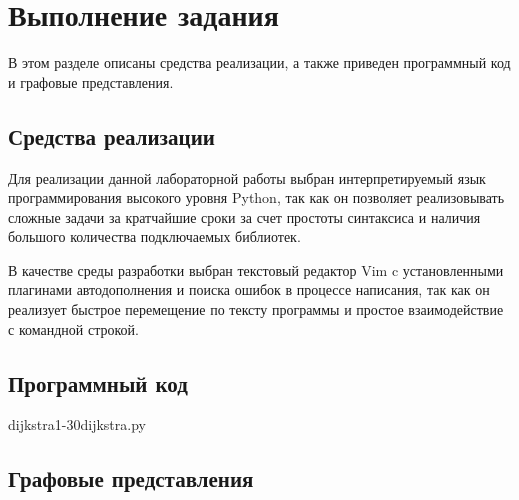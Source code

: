 \chapter{Выполнение задания}

В этом разделе описаны средства реализации, а также приведен программный код и
графовые представления.

\section{Средства реализации}

Для реализации данной лабораторной работы выбран интерпретируемый язык
программирования высокого уровня Python\cite{python}, так как он позволяет
реализовывать сложные задачи за кратчайшие сроки за счет простоты синтаксиса и
наличия большого количества подключаемых библиотек. 

В качестве среды разработки выбран текстовый редактор Vim\cite{vim} c
установленными плагинами автодополнения и поиска ошибок в процессе написания,
так как он реализует быстрое перемещение по тексту программы и простое
взаимодействие с командной строкой.

\section{Программный код}

          {dijkstra}{1-30}{dijkstra.py}

\section{Графовые представления}
